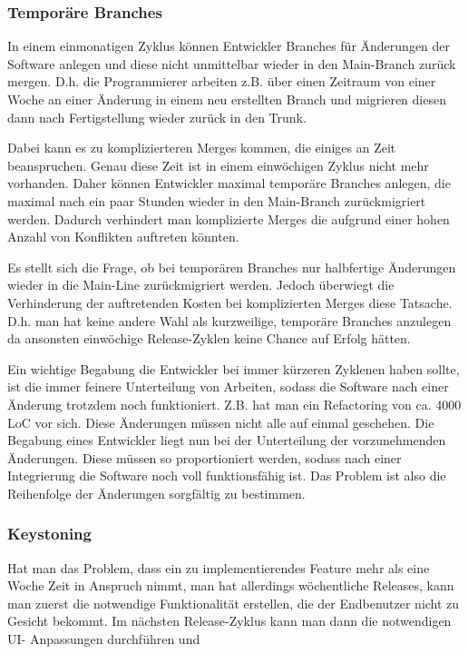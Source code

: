 \subsubsection{Temporäre Branches}
In einem einmonatigen Zyklus können Entwickler Branches für Änderungen der
Software anlegen und diese nicht unmittelbar wieder in den Main-Branch zurück
mergen. D.h. die Programmierer arbeiten z.B. über einen Zeitraum von einer
Woche an einer Änderung in einem neu erstellten Branch und migrieren diesen
dann nach Fertigstellung wieder zurück in den Trunk.

Dabei kann es zu komplizierteren Merges kommen, die einiges an Zeit
beanspruchen. Genau diese Zeit ist in einem einwöchigen Zyklus nicht mehr
vorhanden. Daher können Entwickler maximal temporäre Branches anlegen, die
maximal nach ein paar Stunden wieder in den Main-Branch zurückmigriert werden.
Dadurch verhindert man komplizierte Merges die aufgrund einer hohen Anzahl von
Konflikten auftreten könnten.

Es stellt sich die Frage, ob bei temporären Branches nur halbfertige
Änderungen wieder in die Main-Line zurückmigriert werden. Jedoch überwiegt die
Verhinderung der auftretenden Kosten bei komplizierten Merges diese Tatsache.
D.h. man hat keine andere Wahl als kurzweilige, temporäre Branches anzulegen
da ansonsten einwöchige Release-Zyklen keine Chance auf Erfolg hätten.

Ein wichtige Begabung die Entwickler bei immer kürzeren Zyklenen haben sollte,
ist die immer feinere Unterteilung von Arbeiten, sodass die Software nach
einer Änderung trotzdem noch funktioniert. Z.B. hat man ein Refactoring von
ca. 4000 LoC vor sich. Diese Änderungen müssen nicht alle auf einmal
geschehen. Die Begabung eines Entwickler liegt nun bei der Unterteilung der
vorzunehmenden Änderungen. Diese müssen so proportioniert werden, sodass nach
einer Integrierung die Software noch voll funktionsfähig ist. Das Problem ist
also die Reihenfolge der Änderungen sorgfältig zu bestimmen.

\subsubsection{Keystoning}
Hat man das Problem, dass ein zu implementierendes Feature mehr als eine Woche
Zeit in Anspruch nimmt, man hat allerdings wöchentliche Releases, kann man
zuerst die notwendige Funktionalität erstellen, die der Endbenutzer nicht zu
Gesicht bekommt. Im nächsten Release-Zyklus kann man dann die notwendigen UI-
Anpassungen durchführen und

